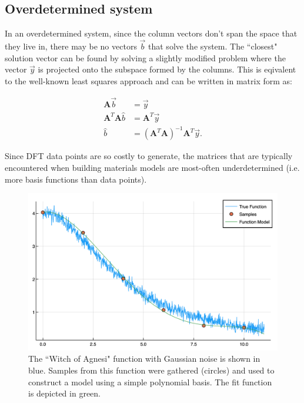 \subsection{Overdetermined system}
In an overdetermined system, since the column vectors don't span the space that they live in, there may be no vectors $\vec{b}$ that solve the system.  The ``closest" solution vector can be found by solving a slightly modified problem where the vector $\vec{y}$ is projected onto the subspace formed by the columns.  This is eqivalent to the well-known least squares approach and can be written in matrix form as:

\begin{align}
\mathbf{A}\vec{b} &= \vec{y} \label{eq:Aby} \\
\mathbf{A}^T\mathbf{A}\hat{b} &= \mathbf{A}^T\vec{y}\\
\hat{b} &= (\mathbf{A}^T\mathbf{A})^{-1}\mathbf{A}^T\vec{y}. \nonumber %
\end{align}

\par Since DFT data points are so costly to generate, the matrices that are typically encountered when building materials models are most-often underdetermined (i.e. more basis functions than data points).


\begin{figure}%
\centering
\includegraphics[scale = 0.6]{Figures/func1True}
\caption{The ``Witch of Agnesi" function with Gaussian noise is shown in blue.  Samples from this function were gathered (circles) and used to construct a model using a simple polynomial basis.  The fit function is depicted in green.
\label{fig:func1True}} 
\end{figure}



